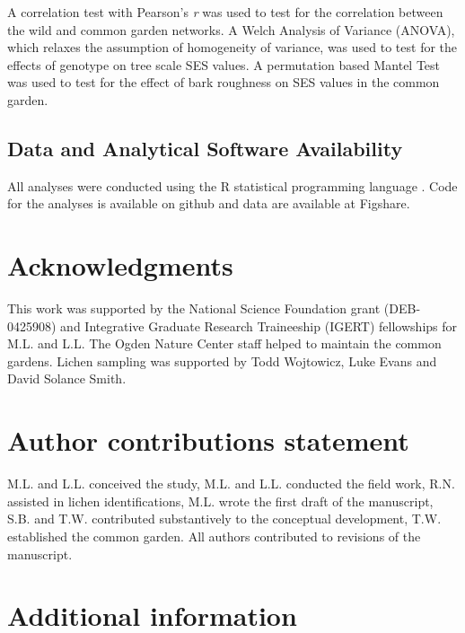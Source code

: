 \documentclass[fleqn,10pt]{wlscirep}
\begin{document}
A correlation test with Pearson’s \textit{r} was used to test for the
correlation between the wild and common garden networks. A Welch
Analysis of Variance (ANOVA), which relaxes the assumption of
homogeneity of variance, was used to test for the effects of genotype
on tree scale SES values. A permutation based Mantel Test was used to
test for the effect of bark roughness on SES values in the common
garden. 


\subsection*{Data and Analytical Software Availability}

All analyses were conducted using the R statistical programming
language \cite{RCoreTeam2017}. Code for the analyses is available on
github and data are available at Figshare.




\section*{Acknowledgments} 

This work was supported by the National Science Foundation grant
(DEB-0425908) and Integrative Graduate Research Traineeship (IGERT)
fellowships for M.L. and L.L. The Ogden Nature Center staff helped to
maintain the common gardens. Lichen sampling was supported by Todd
Wojtowicz, Luke Evans and David Solance Smith.


\section*{Author contributions statement}

M.L. and L.L. conceived the study, M.L. and L.L. conducted the field
work, R.N.  assisted in lichen identifications, M.L. wrote the first
draft of the manuscript, S.B. and T.W. contributed substantively to
the conceptual development, T.W. established the common garden. All
authors contributed to revisions of the manuscript.

\section*{Additional information}
\end{document}
